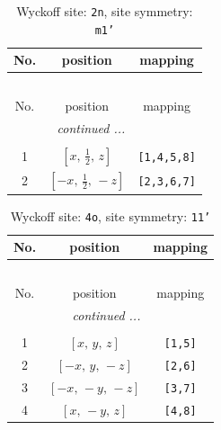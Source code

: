 \documentclass[fleqn,8pt]{jsarticle}
\begin{document}
\begin{longtable}{ccc}
\caption{Wyckoff site: {\tt 2n}, site symmetry: {\tt m1'}}
 \\
 \hline \hline
No. & position & mapping \\ \hline \endfirsthead

\multicolumn{2}{l}{\tablename\ \thetable{}} \\
 \hline \hline
No. & position & mapping \\ \hline \endhead

 \hline \hline
\multicolumn{2}{r}{\footnotesize\it continued ...} \\ \endfoot

 \hline \hline
\multicolumn{2}{r}{} \\ \endlastfoot

1 & $\left[ x,\, \frac{1}{2},\, z \right]$ & {\tt [1,4,5,8]} \\ \hline
2 & $\left[ - x,\, \frac{1}{2},\, - z \right]$ & {\tt [2,3,6,7]} \\
\end{longtable}
\renewcommand{\arraystretch}{1.2}
\begin{longtable}{ccc}
\caption{Wyckoff site: {\tt 4o}, site symmetry: {\tt 11'}}
 \\
 \hline \hline
No. & position & mapping \\ \hline \endfirsthead

\multicolumn{2}{l}{\tablename\ \thetable{}} \\
 \hline \hline
No. & position & mapping \\ \hline \endhead

 \hline \hline
\multicolumn{2}{r}{\footnotesize\it continued ...} \\ \endfoot

 \hline \hline
\multicolumn{2}{r}{} \\ \endlastfoot

1 & $\left[ x,\, y,\, z \right]$ & {\tt [1,5]} \\ \hline
2 & $\left[ - x,\, y,\, - z \right]$ & {\tt [2,6]} \\ \hline
3 & $\left[ - x,\, - y,\, - z \right]$ & {\tt [3,7]} \\ \hline
4 & $\left[ x,\, - y,\, z \right]$ & {\tt [4,8]} \\
\end{longtable}
\end{document}
